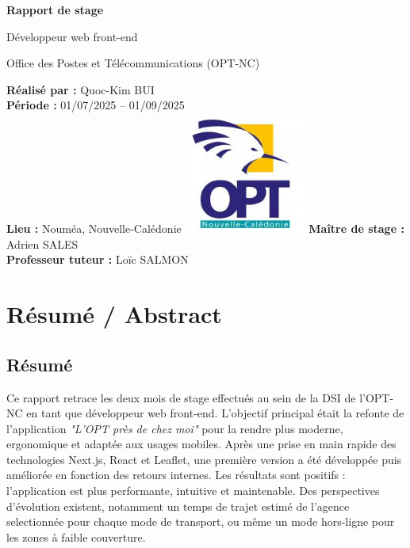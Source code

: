 \documentclass[12pt,a4paper]{report}
\begin{document}
\begin{titlepage}
\centering
{\Huge\bfseries Rapport de stage \par}
\vspace{1cm}
{\Large Développeur web front-end \par}
\vspace{1cm}
{\Large Office des Postes et Télécommunications (OPT-NC) \par}
\vfill
\textbf{Réalisé par :} Quoc-Kim BUI \\
\textbf{Période :} 01/07/2025 – 01/09/2025 \\
\textbf{Lieu :} Nouméa, Nouvelle-Calédonie
\vfill
\includegraphics[width=0.3\textwidth]{ressources_rapport/logo_opt.jpg}
\vfill
\textbf{Maître de stage :} Adrien SALES \\
\textbf{Professeur tuteur :} Loïc SALMON
\end{titlepage}

\chapter*{Résumé / Abstract}

\section*{Résumé}
Ce rapport retrace les deux mois de stage effectués au sein de la DSI de l’OPT-NC en tant que développeur web front-end.  
L’objectif principal était la refonte de l’application \textit{"L’OPT près de chez moi"} pour la rendre plus moderne, ergonomique et adaptée aux usages mobiles.  
Après une prise en main rapide des technologies Next.js, React et Leaflet, une première version a été développée puis améliorée en fonction des retours internes.  
Les résultats sont positifs : l’application est plus performante, intuitive et maintenable.  
Des perspectives d’évolution existent, notamment un temps de trajet estimé de l'agence selectionnée pour chaque mode de transport, ou même un mode hors-ligne pour les zones à faible couverture.
\end{document}
